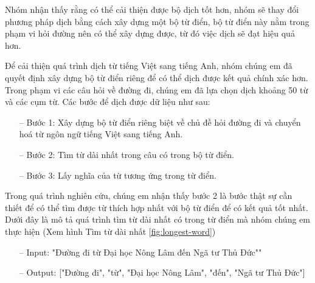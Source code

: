 Nhóm nhận thấy rằng có thể cải thiện được bộ dịch tốt hơn, nhóm sẽ thay đổi phương pháp dịch bằng cách xây dựng một bộ từ điển, bộ từ điển này nằm trong phạm vi hỏi đường nên có thể xây dựng được, từ đó việc dịch sẽ đạt hiệu quả hơn.

Để cải thiện quá trình dịch từ tiếng Việt sang tiếng Anh, nhóm chúng em đã quyết định xây dựng bộ từ điển riêng để có thể dịch được kết quả chính xác hơn.
Trong phạm vi các câu hỏi về đường đi, chúng em đã lựa chọn dịch khoảng 50 từ và các cụm từ. Các bước để dịch được dữ liệu như sau:
\begin{itemize}
    \item[--] Bước 1: Xây dựng bộ từ điển riêng biệt về chủ đề hỏi đường đi và chuyển hoá từ ngôn ngữ tiếng Việt sang tiếng Anh.
    \item[--] Bước 2: Tìm từ dài nhất trong câu có trong bộ từ điển.
    \item[--] Bước 3: Lấy nghĩa của từ tương ứng trong từ điển.
\end{itemize}
Trong quá trình nghiên cứu, chúng em nhận thấy bước 2 là bước thật sự cần thiết để có thể tìm được từ thích hợp nhất với bộ từ điển để có kết quả tốt nhất. Dưới đây là mô tả quá trình tìm từ dài nhất có trong từ điển mà nhóm chúng em thực hiện (Xem hình Tìm từ dài nhất \ref{fig:longest-word})
\begin{itemize}
    \item[--] Input: "Đường đi từ Đại học Nông Lâm đến Ngã tư Thủ Đức""
    \item[--] Output: ["Đường đi", "từ", "Đại học Nông Lâm", "đến", "Ngã tư Thủ Đức"]
\end{itemize}
